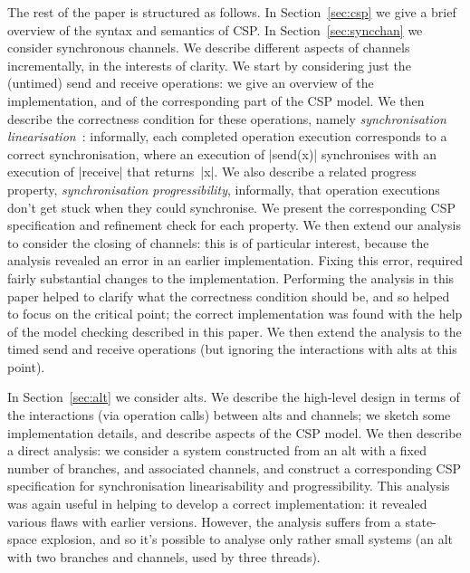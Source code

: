 The rest of the paper is structured as follows.  In Section~\ref{sec:csp} we
give a brief overview of the syntax and semantics of CSP\@.  In
Section~\ref{sec:syncchan} we consider synchronous channels.  We describe
different aspects of channels incrementally, in the interests of clarity.  We
start by considering just the (untimed) send and receive operations: we give
an overview of the implementation, and of the corresponding part of the CSP
model.  We then describe the correctness condition for these operations,
namely \emph{synchronisation linearisation}~\cite{LL:synchronisation}:
informally,  each completed operation execution corresponds to a correct
synchronisation, where an execution of |send(x)| synchronises with an execution
of |receive| that returns~|x|.  We also describe a related progress property,
\emph{synchronisation progressibility}, informally, that operation executions
don't get stuck when they could synchronise.  We present the corresponding CSP
specification and refinement check for each property.  We then extend our
analysis to consider the closing of channels: this is of particular interest,
because the analysis revealed an error in an earlier implementation.  Fixing
this error, required fairly substantial changes to the implementation.
Performing the analysis in this paper helped to clarify what the correctness
condition should be, and so helped to focus on the critical point; the correct
implementation was found with the help of the model checking described in this
paper.  We then extend the analysis to the timed send and receive operations
(but ignoring the interactions with alts at this point).

In Section~\ref{sec:alt} we consider alts.  We describe the high-level design
in terms of the interactions (via operation calls) between alts and channels;
we sketch some implementation details, and describe aspects of the CSP model.
We then describe a direct analysis: we consider a system constructed from an
alt with a fixed number of branches, and associated channels, and construct a
corresponding CSP specification for synchronisation linearisability and
progressibility.  This analysis was again useful in helping to develop a
correct implementation: it revealed various flaws with earlier versions.
However, the analysis suffers from a state-space explosion, and so it's
possible to analyse only rather small systems (an alt with two branches and
channels, used by three threads).

